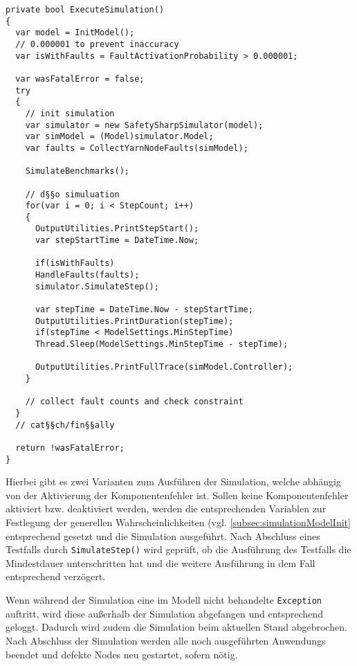 \begin{lstlisting}[label=lst:hadoopSimulation,style=cs,
caption={[Durchführung der Simulation]
    Durchführung der Simulation (gekürzt).}]
private bool ExecuteSimulation()
{
  var model = InitModel();
  // 0.000001 to prevent inaccuracy
  var isWithFaults = FaultActivationProbability > 0.000001;
  
  var wasFatalError = false;
  try
  {
    // init simulation
    var simulator = new SafetySharpSimulator(model);
    var simModel = (Model)simulator.Model;
    var faults = CollectYarnNodeFaults(simModel);
    
    SimulateBenchmarks();
    
    // d§§o simuluation
    for(var i = 0; i < StepCount; i++)
    {
      OutputUtilities.PrintStepStart();
      var stepStartTime = DateTime.Now;
      
      if(isWithFaults)
      HandleFaults(faults);
      simulator.SimulateStep();
      
      var stepTime = DateTime.Now - stepStartTime;
      OutputUtilities.PrintDuration(stepTime);
      if(stepTime < ModelSettings.MinStepTime)
      Thread.Sleep(ModelSettings.MinStepTime - stepTime);
      
      OutputUtilities.PrintFullTrace(simModel.Controller);
    }
    
    // collect fault counts and check constraint
  }
  // cat§§ch/fin§§ally
  
  return !wasFatalError;
}
\end{lstlisting}

Hierbei gibt es zwei Varianten zum Ausführen der Simulation, welche abhängig von der Aktivierung der Komponentenfehler ist.
Sollen keine Komponentenfehler aktiviert bzw. deaktiviert werden, werden die entsprechenden Variablen zur Festlegung der generellen Wahrscheinlichkeiten (vgl. \cref{subsec:simulationModelInit} entsprechend gesetzt und die Simulation ausgeführt.
Nach Abschluss eines Testfalls durch \texttt{SimulateStep()} wird geprüft, ob die Ausführung des Testfalls die Mindestdauer unterschritten hat und die weitere Ausführung in dem Fall entsprechend verzögert.

Wenn während der Simulation eine im Modell nicht behandelte \texttt{Exception} auftritt, wird diese außerhalb der Simulation abgefangen und entsprechend geloggt.
Dadurch wird zudem die Simulation beim aktuellen Stand abgebrochen.
Nach Abschluss der Simulation werden alle noch ausgeführten \glspl{Anwendung} beendet und defekte Nodes neu gestartet, sofern nötig.

